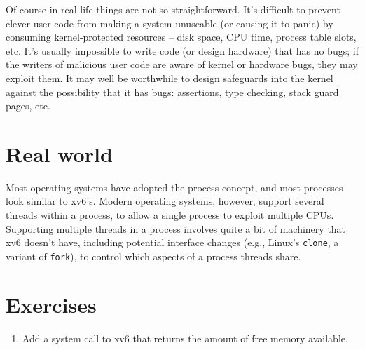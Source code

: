 Of course in real life things are not so straightforward. It's
difficult to prevent clever user code from making a system unuseable
(or causing it to panic) by consuming kernel-protected resources --
disk space, CPU time, process table slots, etc. It's usually
impossible to write code (or design hardware) that has no bugs; if the
writers of malicious user code are aware of kernel or hardware bugs,
they may exploit them. It may well be worthwhile to design safeguards
into the kernel against the possibility that it has bugs: assertions,
type checking, stack guard pages, etc.


\section{Real world}

Most operating systems have adopted the process concept, and most
processes look similar to xv6's.  Modern operating systems, however,
support several threads within a process, to allow a single process to
exploit multiple CPUs.  Supporting multiple threads in a
process involves quite a bit of machinery that xv6 doesn't have,
including potential interface changes (e.g., Linux's
\lstinline{clone},
a variant of
\lstinline{fork}),
to control which aspects of
a process threads share.
\section{Exercises}

\begin{enumerate}

\item Add a system call to xv6
  that returns the amount of free memory available.


\end{enumerate}
